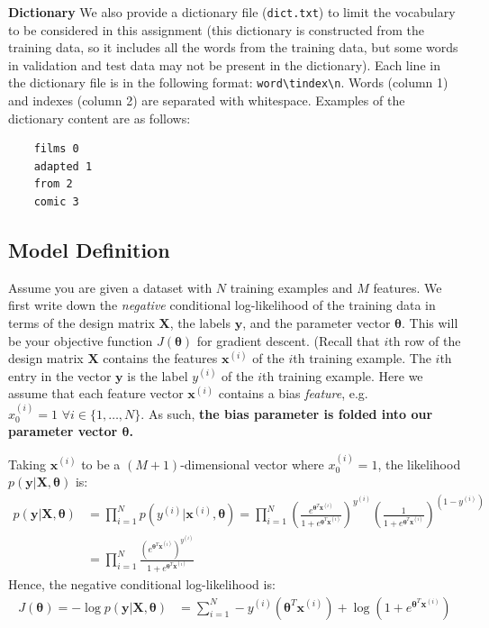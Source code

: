 \documentclass[11pt]{article}
\numberwithin{equation}{section} %
\numberwithin{figure}{section} %
\numberwithin{table}{section} %
\def\x{\mathbf x}
\def\y{\mathbf y}
\newcommand{\xv}{\mathbf{x}}
\newcommand{\yv}{\mathbf{y}}
\newcommand{\Xv}{\mathbf{X}}
\newcommand{\thetav     }{\boldsymbol \theta     }
\begin{document}
  {\bf Dictionary } We also provide a dictionary file (\lstinline{dict.txt}) to limit the vocabulary to be considered in this assignment (this dictionary is constructed from the training data, so it includes all the words from the training data, but some words in validation and test data may not be present in the dictionary). Each line in the dictionary file is in the following format: \lstinline{word\tindex\n}. Words (column 1) and indexes (column 2) are separated with whitespace. Examples of the dictionary content are as follows: 
    \begin{lstlisting}
    films 0
    adapted 1
    from 2
    comic 3
    \end{lstlisting}
 
\subsection{Model Definition}\label{modeldescript}
 
 Assume you are given a dataset with $N$ training examples and $M$ features. We first write down the \emph{negative} conditional log-likelihood of the training data in terms of the design matrix $\Xv$, the labels $\yv$, and the parameter vector $\thetav$. This will be your objective function $J(\thetav)$ for gradient descent. 
%
(Recall that $i$th row of the design matrix $\Xv$ contains the features $\xv^{(i)}$ of the $i$th training example. The $i$th entry in the vector $\yv$ is the label $y^{(i)}$ of the $i$th training example.  Here we assume that each feature vector $\xv^{(i)}$ contains a bias \emph{feature}, e.g. $x_0^{(i)} = 1 \,\,\forall i \in \{1,\ldots,N\}$. As such, \textbf{the bias parameter is folded into our parameter vector $\thetav$.}


Taking $\x^{\left(i\right)}$ to be a $(M+1)$-dimensional vector where $x^{(i)}_0=1$, the likelihood $p\left(\y|\mathbf{X},\thetav\right)$ is:
\begin{align}
     p(\y |\mathbf{X},\thetav) &= \prod_{i = 1}^N p(y^{(i)} | \x^{(i)}, \thetav) = \prod_{i = 1}^N \left(\frac{e^{\thetav^T\x^{\left(i\right)}}}{1+e^{\thetav^T\x^{\left(i\right)}}}\right)^{y^{(i)}}\left(\frac{1}{1+e^{\thetav^T\x^{\left(i\right)}}}\right)^{\left(1-y^{(i)}\right)}\\
    &= \prod_{i=1}^N \frac{\left(e^{\thetav^T\x^{\left(i\right)}}\right)^{y^{(i)}}}{1+e^{\thetav^T\x^{\left(i\right)}}}
\end{align}
Hence, the negative conditional log-likelihood is:
\begin{align}
    J(\thetav)= -\log p\left(\y|\mathbf{X},\thetav\right) &= \sum_{i=1}^N  -y^{(i)}\left(\thetav^T\x^{\left(i\right)}\right)+\log\left(1+e^{\thetav^T\x^{\left(i\right)}}\right)
\end{align}
\end{document}
